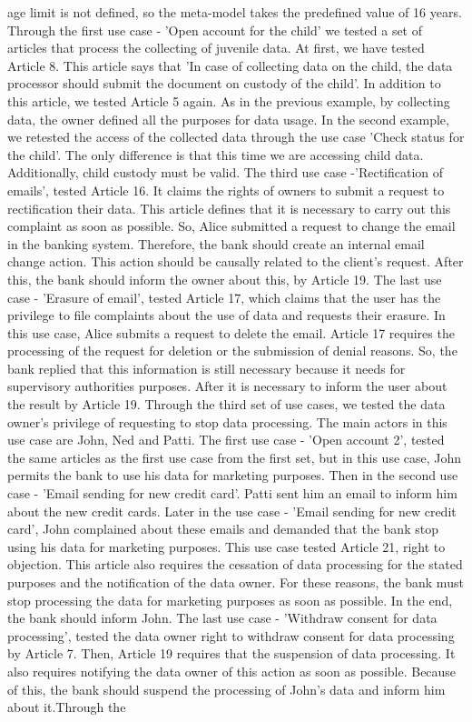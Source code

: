 \documentclass[11pt,english]{article}
\begin{document}
age limit is not defined, so the meta-model takes the predefined value of 16 years. Through the first use case - 'Open account for the child' we tested a set of articles that process the collecting of juvenile data. At first, we have tested Article 8. This article says that 'In case of collecting data on the child, the data processor should submit the document on custody of the child'. In addition to this article, we tested Article 5 again. As in the previous example, by collecting data, the owner defined all the purposes for data usage. In the second example, we retested the access of the collected data through the use case 'Check status for the child'. The only difference is that this time we are accessing child data. Additionally, child custody must be valid. The third use case -'Rectification of emails', tested Article 16. It claims the rights of owners to submit a request to rectification their data. This article defines that it is necessary to carry out this complaint as soon as possible. So, Alice submitted a request to change the email in the banking system. Therefore, the bank should create an internal email change action. This action should be causally related to the client's request. After this, the bank should inform the owner about this, by Article 19. The last use case - 'Erasure of email', tested Article 17, which claims that the user has the privilege to file complaints about the use of data and requests their erasure. In this use case, Alice submits a request to delete the email. Article 17 requires the processing of the request for deletion or the submission of denial reasons. So, the bank replied that this information is still necessary because it needs for supervisory authorities purposes. After it is necessary to inform the user about the result by Article 19. \newline Through the third set of use cases, we tested the data owner's privilege of requesting to stop data processing. The main actors in this use case are John, Ned and Patti. The first use case - 'Open account 2', tested the same articles as the first use case from the first set, but in this use case, John permits the bank to use his data for marketing purposes. Then in the second use case - 'Email sending for new credit card'. Patti sent him an email to inform him about the new credit cards. Later in the use case - 'Email sending for new credit card', John complained about these emails and demanded that the bank stop using his data for marketing purposes. This use case tested Article 21, right to objection. This article also requires the cessation of data processing for the stated purposes and the notification of the data owner. For these reasons, the bank must stop processing the data for marketing purposes as soon as possible. In the end, the bank should inform John. The last use case - 'Withdraw consent for data processing', tested the data owner right to withdraw consent for data processing by Article 7. Then, Article 19 requires that the suspension of data processing. It also requires notifying the data owner of this action as soon as possible. Because of this, the bank should suspend the processing of John's data and inform him about it.\newline Through the 
\end{document}
